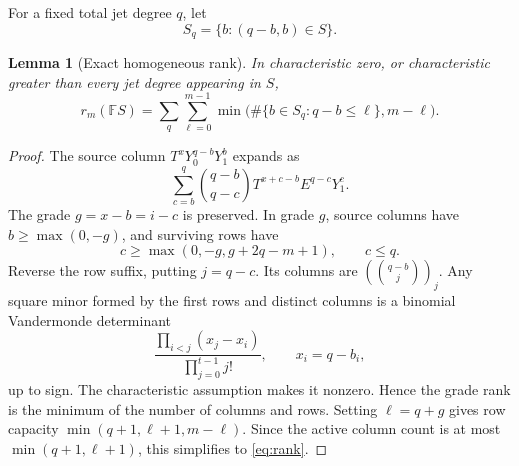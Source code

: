 \documentclass[11pt]{article}
\newtheorem{lemma}[theorem]{Lemma}
\theoremstyle{remark}\newtheorem{remark}[theorem]{Remark}
\begin{document}
For a fixed total jet degree $q$, let
\[
 S_q=\{b:(q-b,b)\in S\}.
\]
\begin{lemma}[Exact homogeneous rank]\label{lem:rank}
In characteristic zero, or characteristic greater than every jet degree appearing in $S$,
\begin{equation}\label{eq:rank}
 r_m(\mathbb F S)=\sum_q\sum_{\ell=0}^{m-1}
 \min\bigl(\#\{b\in S_q:q-b\le\ell\},m-\ell\bigr).
\end{equation}
\end{lemma}
\begin{proof}
The source column $T^xY_0^{q-b}Y_1^b$ expands as
\[
 \sum_{c=b}^q\binom{q-b}{q-c}T^{x+c-b}E^{q-c}Y_1^c.
\]
The grade $g=x-b=i-c$ is preserved. In grade $g$, source columns have $b\ge\max(0,-g)$, and surviving rows have
\[
 c\ge\max(0,-g,g+2q-m+1),\qquad c\le q.
\]
Reverse the row suffix, putting $j=q-c$. Its columns are $(\binom{q-b}{j})_j$. Any square minor formed by the first rows and distinct columns is a binomial Vandermonde determinant
\[
 \frac{\prod_{i<j}(x_j-x_i)}{\prod_{j=0}^{t-1}j!},\qquad x_i=q-b_i,
\]
up to sign. The characteristic assumption makes it nonzero. Hence the grade rank is the minimum of the number of columns and rows. Setting $\ell=q+g$ gives row capacity $\min(q+1,\ell+1,m-\ell)$. Since the active column count is at most $\min(q+1,\ell+1)$, this simplifies to \eqref{eq:rank}.
\end{proof}
\end{document}
